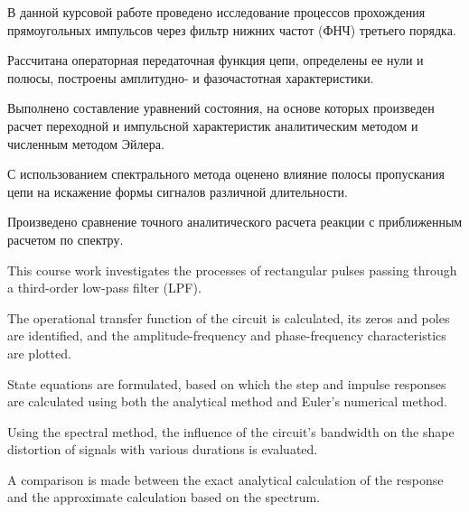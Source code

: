 В данной курсовой работе проведено исследование процессов прохождения прямоугольных импульсов через фильтр нижних частот (ФНЧ) третьего порядка.

Рассчитана операторная передаточная функция цепи, определены ее нули и полюсы, построены амплитудно- и фазочастотная характеристики.

Выполнено составление уравнений состояния, на основе которых произведен расчет переходной и импульсной характеристик аналитическим методом и численным методом Эйлера.

С использованием спектрального метода оценено влияние полосы пропускания цепи на искажение формы сигналов различной длительности.

Произведено сравнение точного аналитического расчета реакции с приближенным расчетом по спектру.

\vspace{2cm}
This course work investigates the processes of rectangular pulses passing through a third-order low-pass filter (LPF).

The operational transfer function of the circuit is calculated, its zeros and poles are identified, and the amplitude-frequency and phase-frequency characteristics are plotted.

State equations are formulated, based on which the step and impulse responses are calculated using both the analytical method and Euler's numerical method.

Using the spectral method, the influence of the circuit's bandwidth on the shape distortion of signals with various durations is evaluated.

A comparison is made between the exact analytical calculation of the response and the approximate calculation based on the spectrum.